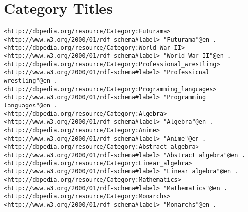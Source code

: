 \section{Category Titles}
\begin{lstlisting}[breaklines, basicstyle=\small]
<http://dbpedia.org/resource/Category:Futurama> <http://www.w3.org/2000/01/rdf-schema#label> "Futurama"@en .
<http://dbpedia.org/resource/Category:World_War_II> <http://www.w3.org/2000/01/rdf-schema#label> "World War II"@en .
<http://dbpedia.org/resource/Category:Professional_wrestling> <http://www.w3.org/2000/01/rdf-schema#label> "Professional wrestling"@en .
<http://dbpedia.org/resource/Category:Programming_languages> <http://www.w3.org/2000/01/rdf-schema#label> "Programming languages"@en .
<http://dbpedia.org/resource/Category:Algebra> <http://www.w3.org/2000/01/rdf-schema#label> "Algebra"@en .
<http://dbpedia.org/resource/Category:Anime> <http://www.w3.org/2000/01/rdf-schema#label> "Anime"@en .
<http://dbpedia.org/resource/Category:Abstract_algebra> <http://www.w3.org/2000/01/rdf-schema#label> "Abstract algebra"@en .
<http://dbpedia.org/resource/Category:Linear_algebra> <http://www.w3.org/2000/01/rdf-schema#label> "Linear algebra"@en .
<http://dbpedia.org/resource/Category:Mathematics> <http://www.w3.org/2000/01/rdf-schema#label> "Mathematics"@en .
<http://dbpedia.org/resource/Category:Monarchs> <http://www.w3.org/2000/01/rdf-schema#label> "Monarchs"@en .
\end{lstlisting}

